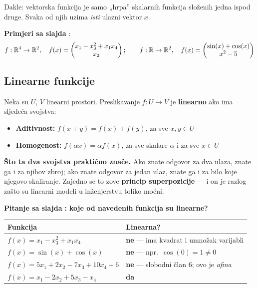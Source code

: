 Dakle: vektorska funkcija je samo „hrpa” skalarnih funkcija složenih jedna
ispod druge. Svaka od njih uzima \emph{isti} ulazni vektor $x$.

\textbf{Primjeri sa slajda} :
\[
f : \mathbb{R}^4 \to \mathbb{R}^2, \quad
f(x) = \begin{pmatrix} x_1 - x_3^2 + x_1x_4 \\ x_2 \end{pmatrix};
\qquad
f : \mathbb{R} \to \mathbb{R}^2, \quad
f(x) = \begin{pmatrix} \sin(x) + \cos(x) \\ x^2 - 5 \end{pmatrix}
\]

\subsection{Linearne funkcije}

\begin{definicija}[Linearnost]
Neka su $U$, $V$ linearni prostori. Preslikavanje $f : U \to V$ je
\textbf{linearno} ako ima sljedeća svojstva:
\begin{itemize}
  \item \textbf{Aditivnost:} $f(x + y) = f(x) + f(y)$, za sve $x, y \in U$
  \item \textbf{Homogenost:} $f(\alpha x) = \alpha f(x)$, za sve skalare
        $\alpha$ i za sve $x \in U$
\end{itemize}
\end{definicija}

\textbf{Što ta dva svojstva praktično znače.} Ako znate odgovor za dva ulaza,
znate ga i za njihov zbroj; ako znate odgovor za jedan ulaz, znate ga i za bilo
koje njegovo skaliranje. Zajedno se to zove \textbf{princip superpozicije} ---
i on je razlog zašto su linearni modeli u inženjerstvu toliko moćni.

\textbf{Pitanje sa slajda} \textbf{: koje od navedenih funkcija su
linearne?}

\begin{center}
\begin{tabular}{P{8.6cm}P{4.4cm}}
\toprule
\textbf{Funkcija} & \textbf{Linearna?} \\
\midrule
$f(x) = x_1 - x_3^2 + x_1x_4$ & \textbf{ne} --- ima kvadrat i umnožak
  varijabli \\
$f(x) = \sin(x) + \cos(x)$ & \textbf{ne} --- npr.\ $\cos(0)=1 \ne 0$ \\
$f(x) = 5x_1 + 2x_2 - 7x_3 + 10x_4 + 6$ & \textbf{ne} --- slobodni član $6$;
  ovo je \emph{afina} \\
$f(x) = x_1 - 2x_2 + 5x_3 - x_4$ & \textbf{da} \\
\bottomrule
\end{tabular}
\end{center}

